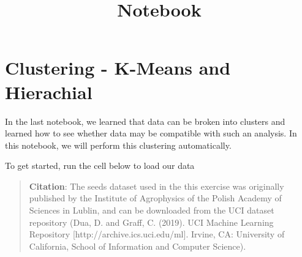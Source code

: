 \documentclass[11pt]{article}
\title{Notebook}
\begin{document}
    
    \maketitle
    
    

    
    \hypertarget{clustering---k-means-and-hierachial}{%
\section{Clustering - K-Means and
Hierachial}\label{clustering---k-means-and-hierachial}}

In the last notebook, we learned that data can be broken into clusters
and learned how to see whether data may be compatible with such an
analysis. In this notebook, we will perform this clustering
automatically.

To get started, run the cell below to load our data

\begin{quote}
\textbf{Citation}: The seeds dataset used in the this exercise was
originally published by the Institute of Agrophysics of the Polish
Academy of Sciences in Lublin, and can be downloaded from the UCI
dataset repository (Dua, D. and Graff, C. (2019). UCI Machine Learning
Repository {[}http://archive.ics.uci.edu/ml{]}. Irvine, CA: University
of California, School of Information and Computer Science).
\end{quote}
\end{document}
